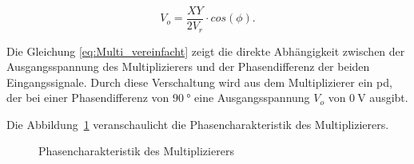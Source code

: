 \documentclass[../main.tex]{subfiles}
\begin{document}
\begin{equation}
    V_o = \frac{X Y}{2 V_r} \cdot cos(\phi).
\label{eq:Multi_vereinfacht}
\end{equation}


Die Gleichung \ref{eq:Multi_vereinfacht} zeigt die direkte Abhängigkeit zwischen der Ausgangsspannung des Multiplizierers und der Phasendifferenz der beiden Eingangssignale. Durch diese Verschaltung wird aus dem Multiplizierer ein \gls{pd}, der bei einer Phasendifferenz von $\SI{90}{\degree}$ eine Ausgangsspannung $V_o$ von $\SI{0}{\volt}$ ausgibt.\cite{Lab_Kit_PRO} \par
\medskip
Die Abbildung~\ref{fig:av_volt_phase} veranschaulicht die Phasencharakteristik des Multiplizierers.\par
\medskip


\begin{figure}[H]
    \centering
    \caption{Phasencharakteristik des Multiplizierers \cite{YT_stf_lecture23} }
    \label{fig:av_volt_phase}
\end{figure}


\end{document}
